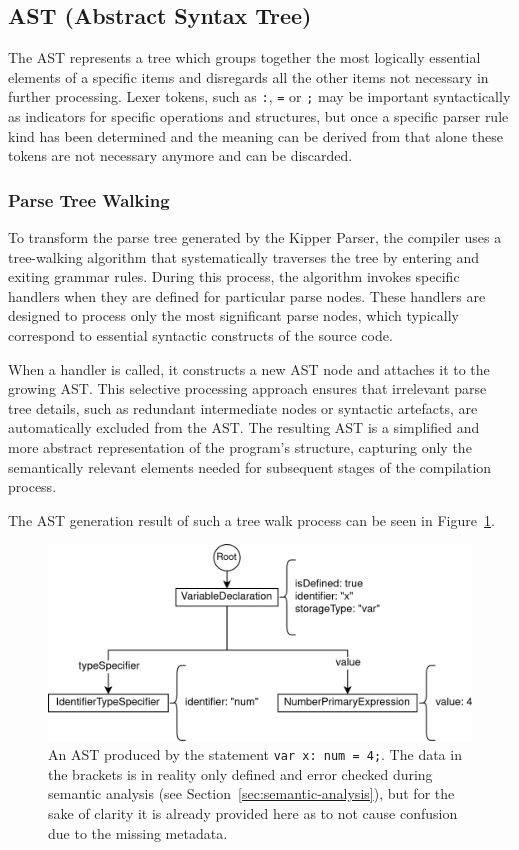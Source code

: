 \subsection{AST (Abstract Syntax Tree)}
\label{sec:translation-to-the-ast}

The AST represents a tree which groups together the most logically essential elements of a specific items and disregards all the other items not necessary in further processing. Lexer tokens, such as \lstinline|:|, \lstinline|=| or \lstinline|;| may be important syntactically as indicators for specific operations and structures, but once a specific parser rule kind has been determined and the meaning can be derived from that alone these tokens are not necessary anymore and can be discarded.

\subsubsection{Parse Tree Walking}

To transform the parse tree generated by the Kipper Parser, the compiler uses a tree-walking algorithm that systematically traverses the tree by entering and exiting grammar rules. During this process, the algorithm invokes specific handlers when they are defined for particular parse nodes. These handlers are designed to process only the most significant parse nodes, which typically correspond to essential syntactic constructs of the source code.

When a handler is called, it constructs a new AST node and attaches it to the growing AST. This selective processing approach ensures that irrelevant parse tree details, such as redundant intermediate nodes or syntactic artefacts, are automatically excluded from the AST. The resulting AST is a simplified and more abstract representation of the program's structure, capturing only the semantically relevant elements needed for subsequent stages of the compilation process.

The AST generation result of such a tree walk process can be seen in Figure~\ref{fig:implementation:ast}.

\begin{figure}[h!]
	\centering
	\includegraphics[scale=1]{./pics/AST.drawio}
	\caption{An AST produced by the statement \lstinline|var x: num = 4;|. The data in the brackets is in reality only defined and error checked during semantic analysis (see Section~\ref{sec:semantic-analysis}), but for the sake of clarity it is already provided here as to not cause confusion due to the missing metadata.}
	\label{fig:implementation:ast}
\end{figure}

